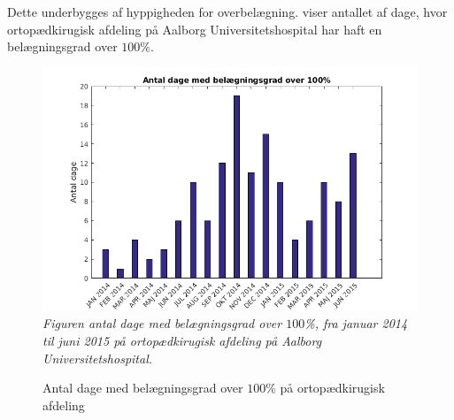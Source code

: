 Dette underbygges af hyppigheden for overbelægning.  viser antallet af dage, hvor ortopædkirugisk afdeling på Aalborg Universitetshospital har haft en belægningsgrad over $100$\%.

\begin{figure}[H]
	\flushleft 
	\caption{Antal dage med belægningsgrad over $100$\% på ortopædkirugisk afdeling}
	\centering
	\includegraphics[scale=.7]{figures/antaldage.png}
	\label{antaldage}
	\flushleft
	\textit{Figuren antal dage med belægningsgrad over $100$\%, fra januar 2014 til juni 2015 på ortopædkirugisk afdeling på Aalborg Universitetshospital.}
\end{figure}